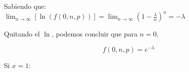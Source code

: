 \documentclass{beamer}
\begin{document}
\begin{frame}{}
Sabiendo que: \\

$ \lim_{n \to \infty} [\ln (f(0,n,p))] = \lim_{n \to \infty} (1 -
\frac{\lambda}{n})^n = -\lambda$

\vfill
Quitando el $\ln$, podemos concluir que para $n=0$,

\begin{equation}
  f(0,n,p) = e^{-\lambda}
\end{equation}

\end{frame}

\begin{frame}{}
  Si $x=1$:

  
\end{frame}


\begin{frame}{}
\end{frame}

\begin{frame}{}
\end{frame}

\begin{frame}{}
\end{frame}

\begin{frame}{}
\end{frame}
\end{document}
